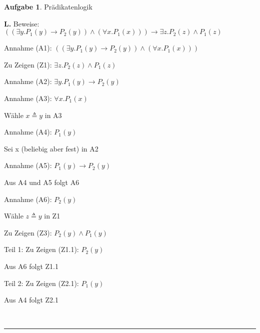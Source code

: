 \documentclass[10pt,leqno ]{article}
\theoremstyle{definition}
\newtheorem{problem}[theorem]{Aufgabe}
\newenvironment{solution}[1][L]{\begin{doublespace}\textbf{#1.}\quad }{\ \rule{0.5em}{0.5em}\end{doublespace}}
\begin{document}
\begin{problem}
    Prädikatenlogik
\end{problem}

\begin{solution}
Beweise: \( ((\exists y . P_1(y) \rightarrow P_2(y)) \land (\forall x . P_1(x))) \rightarrow \exists z . P_2(z) \land P_1(z) \)

Annahme (A1): \( ((\exists y . P_1(y) \rightarrow P_2(y)) \land (\forall x . P_1(x))) \)

Zu Zeigen (Z1): \( \exists z . P_2(z) \land P_1(z) \)

Annahme (A2): \( \exists y . P_1(y) \rightarrow P_2(y) \)

Annahme (A3): \( \forall x . P_1(x) \)

Wähle \(  x \triangleq y \) in A3

Annahme (A4): \( P_1(y) \)

Sei x (beliebig aber fest) in A2

Annahme (A5): \( P_1(y) \rightarrow P_2(y) \)

Aus A4 und A5 folgt A6

Annahme (A6): \( P_2(y) \)

Wähle \( z \triangleq y \) in Z1

Zu Zeigen (Z3): \( P_2(y) \land P_1(y) \)

Teil 1: Zu Zeigen (Z1.1): \( P_2(y) \)

\qquad Aus A6 folgt Z1.1

Teil 2: Zu Zeigen (Z2.1): \( P_1(y) \)

\qquad Aus A4 folgt Z2.1

\end{solution}
\end{document}
